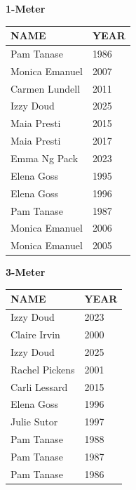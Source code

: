 \begin{table}[H]
\centering
\begin{minipage}[t]{0.6\textwidth}
\centering
\textbf{1-Meter}\\[0.1cm]
\begin{tabular}{@{}p{2.8cm}p{1.2cm}@{}}
\hline
    \textbf{NAME} & \textbf{YEAR} \\
\hline
    Pam Tanase & 1986 \\
    Monica Emanuel & 2007 \\
    Carmen Lundell & 2011 \\
    Izzy Doud & 2025 \\
    Maia Presti & 2015 \\
    Maia Presti & 2017 \\
    Emma Ng Pack & 2023 \\
    Elena Goss & 1995 \\
    Elena Goss & 1996 \\
    Pam Tanase & 1987 \\
    Monica Emanuel & 2006 \\
    Monica Emanuel & 2005 \\
\hline
\end{tabular}
\end{minipage}
\end{table}

\begin{table}[H]
\centering
\begin{minipage}[t]{0.6\textwidth}
\centering
\textbf{3-Meter}\\[0.1cm]
\begin{tabular}{@{}p{2.8cm}p{1.2cm}@{}}
\hline
    \textbf{NAME} & \textbf{YEAR} \\
\hline
    Izzy Doud & 2023 \\
    Claire Irvin & 2000 \\
    Izzy Doud & 2025 \\
    Rachel Pickens & 2001 \\
    Carli Lessard & 2015 \\
    Elena Goss & 1996 \\
    Julie Sutor & 1997 \\
    Pam Tanase & 1988 \\
    Pam Tanase & 1987 \\
    Pam Tanase & 1986 \\
\hline
\end{tabular}
\end{minipage}
\end{table}

